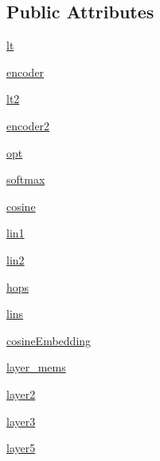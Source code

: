 \subsection*{Public Attributes}
\begin{DoxyCompactItemize}
\item 
\hyperlink{classprojects_1_1personachat_1_1kvmemnn_1_1modules_1_1Kvmemnn_abee4a48e597c58cbbb923fb622804469}{lt}
\item 
\hyperlink{classprojects_1_1personachat_1_1kvmemnn_1_1modules_1_1Kvmemnn_a821cb0619744f2f554ae35e87edc0677}{encoder}
\item 
\hyperlink{classprojects_1_1personachat_1_1kvmemnn_1_1modules_1_1Kvmemnn_a5aa0348491e6c179c06ce002c4e8a191}{lt2}
\item 
\hyperlink{classprojects_1_1personachat_1_1kvmemnn_1_1modules_1_1Kvmemnn_a55fa378066edb2ecece35a314d9557f9}{encoder2}
\item 
\hyperlink{classprojects_1_1personachat_1_1kvmemnn_1_1modules_1_1Kvmemnn_ab471bbd25934cf2552ee9e4ff0d6f4cf}{opt}
\item 
\hyperlink{classprojects_1_1personachat_1_1kvmemnn_1_1modules_1_1Kvmemnn_a79162a8fe6b5055d271e47e20b75ac79}{softmax}
\item 
\hyperlink{classprojects_1_1personachat_1_1kvmemnn_1_1modules_1_1Kvmemnn_ad528a310e56005644b5c02b2cf026386}{cosine}
\item 
\hyperlink{classprojects_1_1personachat_1_1kvmemnn_1_1modules_1_1Kvmemnn_ac12c4e5c157ed78a9f9182e2523689a8}{lin1}
\item 
\hyperlink{classprojects_1_1personachat_1_1kvmemnn_1_1modules_1_1Kvmemnn_adb44933e4b3152da89b60df3a28cf198}{lin2}
\item 
\hyperlink{classprojects_1_1personachat_1_1kvmemnn_1_1modules_1_1Kvmemnn_a91a3e885f9423a5923c70de84c70eef2}{hops}
\item 
\hyperlink{classprojects_1_1personachat_1_1kvmemnn_1_1modules_1_1Kvmemnn_a395a2d5100f2b89ea94cfd362e598717}{lins}
\item 
\hyperlink{classprojects_1_1personachat_1_1kvmemnn_1_1modules_1_1Kvmemnn_a34b907f62828207f3e0204afa56986d3}{cosine\+Embedding}
\item 
\hyperlink{classprojects_1_1personachat_1_1kvmemnn_1_1modules_1_1Kvmemnn_a9d13128e199df7deb4f535f12cdeb07d}{layer\+\_\+mems}
\item 
\hyperlink{classprojects_1_1personachat_1_1kvmemnn_1_1modules_1_1Kvmemnn_a63823e464c6e11bbd82c48275ec655ac}{layer2}
\item 
\hyperlink{classprojects_1_1personachat_1_1kvmemnn_1_1modules_1_1Kvmemnn_a0e0648bb406f06754d3d27bf02e3ca7b}{layer3}
\item 
\hyperlink{classprojects_1_1personachat_1_1kvmemnn_1_1modules_1_1Kvmemnn_a626a650079c57253ddbc91cb2e5e5fa5}{layer5}
\end{DoxyCompactItemize}


